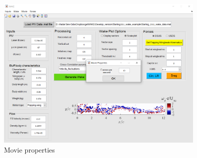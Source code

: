 \documentclass[12pt,a4paper]{article}
\begin{document}
\begin{figure}[ht!]
	\centering
	\includegraphics[width=0.9\textwidth]{movie-properties}
	\caption{Movie properties}
	\label{fig:GUI-movie-properties}
\end{figure}

\newpage
\end{document}
